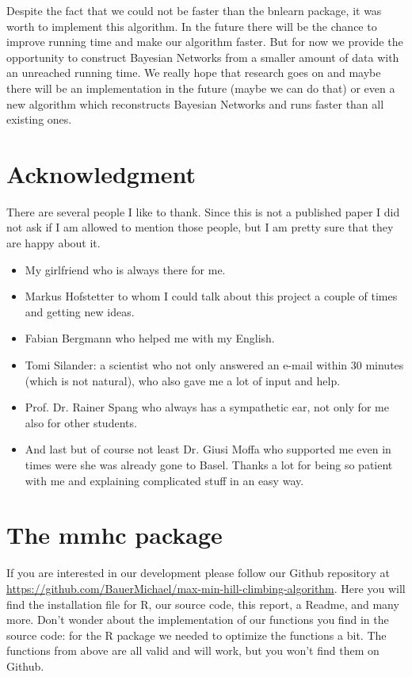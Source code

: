 	Despite the fact that we could not be faster than the bnlearn package, it was worth to implement this algorithm. In the future there will be the chance to improve running time and make our algorithm faster. But for now we provide the opportunity to construct Bayesian Networks from a smaller amount of data with an unreached running time. We really hope that research goes on and maybe there will be an implementation in the future (maybe we can do that) or even a new algorithm which reconstructs Bayesian Networks and runs faster than all existing ones.

\chapter*{Acknowledgment}

	There are several people I like to thank. Since this is not a published paper I did not ask if I am allowed to mention those people, but I am pretty sure that they are happy about it.

	\begin{itemize}
		\item My girlfriend who is always there for me.
		\item Markus Hofstetter to whom I could talk about this project a couple of times and getting new ideas.
		\item Fabian Bergmann who helped me with my English.
		\item Tomi Silander: a scientist who not only answered an e-mail within 30 minutes (which is not natural), who also gave me a lot of input and help.
		\item Prof. Dr. Rainer Spang who always has a sympathetic ear, not only for me also for other students.
		\item And last but of course not least Dr. Giusi Moffa who supported me even in times were she was already gone to Basel. Thanks a lot for being so patient with me and explaining complicated stuff in an easy way.
	\end{itemize}

\chapter*{The mmhc package}

	If you are interested in our development please follow our Github repository at \url{https://github.com/BauerMichael/max-min-hill-climbing-algorithm}. Here you will find the installation file for R, our source code, this report, a Readme, and many more. Don't wonder about the implementation of our functions you find in the source code: for the R package we needed to optimize the functions a bit. The functions from above are all valid and will work, but you won't find them on Github.

